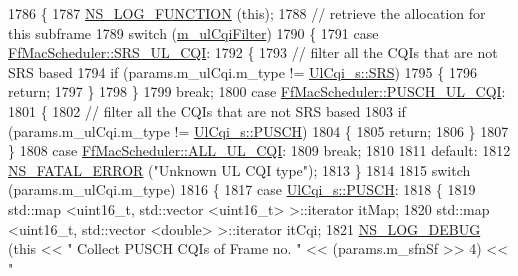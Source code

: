 \begin{DoxyCode}
1786 \{
1787   \hyperlink{log-macros-disabled_8h_a90b90d5bad1f39cb1b64923ea94c0761}{NS\_LOG\_FUNCTION} (\textcolor{keyword}{this});
1788 \textcolor{comment}{// retrieve the allocation for this subframe}
1789   \textcolor{keywordflow}{switch} (\hyperlink{classns3_1_1FfMacScheduler_adae16e66a1c4231da80a1221297442cf}{m\_ulCqiFilter})
1790     \{
1791     \textcolor{keywordflow}{case} \hyperlink{classns3_1_1FfMacScheduler_aa47a9eb25f2c558c825b0be645304a52af2e0df473ba2c8f9cb131cb760591aed}{FfMacScheduler::SRS\_UL\_CQI}:
1792       \{
1793         \textcolor{comment}{// filter all the CQIs that are not SRS based}
1794         \textcolor{keywordflow}{if} (params.m\_ulCqi.m\_type != \hyperlink{structns3_1_1UlCqi__s_aece9e5ebea42eb9ff1744c72c8459b57af4b6dba4243636562c910c4d4761dd7e}{UlCqi\_s::SRS})
1795           \{
1796             \textcolor{keywordflow}{return};
1797           \}
1798       \}
1799       \textcolor{keywordflow}{break};
1800     \textcolor{keywordflow}{case} \hyperlink{classns3_1_1FfMacScheduler_aa47a9eb25f2c558c825b0be645304a52a4a833bc779439b15bd904e1dd8eaa563}{FfMacScheduler::PUSCH\_UL\_CQI}:
1801       \{
1802         \textcolor{comment}{// filter all the CQIs that are not SRS based}
1803         \textcolor{keywordflow}{if} (params.m\_ulCqi.m\_type != \hyperlink{structns3_1_1UlCqi__s_aece9e5ebea42eb9ff1744c72c8459b57a9716b20a3095c473ae3fde1eb5d0bb63}{UlCqi\_s::PUSCH})
1804           \{
1805             \textcolor{keywordflow}{return};
1806           \}
1807       \}
1808     \textcolor{keywordflow}{case} \hyperlink{classns3_1_1FfMacScheduler_aa47a9eb25f2c558c825b0be645304a52a84059a597c72335f0a5963c3efcbda71}{FfMacScheduler::ALL\_UL\_CQI}:
1809       \textcolor{keywordflow}{break};
1810 
1811     \textcolor{keywordflow}{default}:
1812       \hyperlink{group__fatal_ga5131d5e3f75d7d4cbfd706ac456fdc85}{NS\_FATAL\_ERROR} (\textcolor{stringliteral}{"Unknown UL CQI type"});
1813     \}
1814 
1815   \textcolor{keywordflow}{switch} (params.m\_ulCqi.m\_type)
1816     \{
1817     \textcolor{keywordflow}{case} \hyperlink{structns3_1_1UlCqi__s_aece9e5ebea42eb9ff1744c72c8459b57a9716b20a3095c473ae3fde1eb5d0bb63}{UlCqi\_s::PUSCH}:
1818       \{
1819         std::map <uint16\_t, std::vector <uint16\_t> >::iterator itMap;
1820         std::map <uint16\_t, std::vector <double> >::iterator itCqi;
1821         \hyperlink{group__logging_ga413f1886406d49f59a6a0a89b77b4d0a}{NS\_LOG\_DEBUG} (\textcolor{keyword}{this} << \textcolor{stringliteral}{" Collect PUSCH CQIs of Frame no. "} << (params.m\_sfnSf >> 4) << \textcolor{stringliteral}{"
}
\end{DoxyCode}
